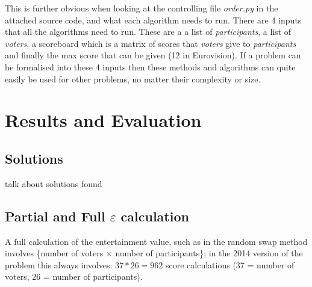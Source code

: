 \documentclass[12pt]{report}
\begin{document}
This is further obvious when looking at the controlling file \textit{order.py} in the attached source code, and what each algorithm needs to run. There are 4 inputs that all the algorithms need to run. These are a a list of \textit{participants}, a list of \textit{voters}, a scoreboard which is a matrix of scores that \textit{voters} give to \textit{participants} and finally the max score that can be given (12 in Eurovision). If a problem can be formalised into these 4 inputs then these methods and algorithms can quite easily be used for other problems, no matter their complexity or size.


\section{Results and Evaluation}\label{Results}
\subsection{Solutions}
talk about solutions found

\subsection{Partial and Full $\varepsilon$ calculation}\label{eCalc}
A full calculation of the entertainment value, such as in the random swap method involves \{number of voters $\times$ number of participants\}; in the 2014 version of the problem this always involves: $37 * 26 = 962$ score calculations (37 = number of voters, 26 = number of participants).
\end{document}

